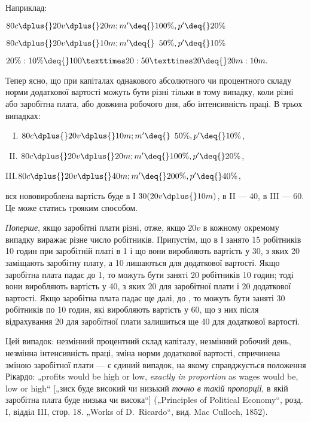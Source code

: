 
Наприклад:
\begin{center}
$80 c \dplus{} 20 v \dplus{} 20 m; m' \deq{} 100\%, p' \deq{} 20\%$

$80 c \dplus{} 20 v \dplus{} 10 m; m' \deq{} \phantom{0}50\%, p' \deq{} 10\%$

$20\%:10\% \deq{} 100×20:50×20 \deq{} 20 m:10 m.$
\end{center}

Тепер ясно, що при капіталах однакового абсолютного чи
процентного складу норми додаткової вартості можуть бути
різні тільки в тому випадку, коли різні або заробітна плата,
або довжина робочого дня, або інтенсивність праці. В трьох
випадках:
\begin{center}
$\phantom{II}$I. $80 c \dplus{} 20 v \dplus{} 10 m; m' \deq{} \phantom{0}50\%, p' \deq{} 10\%$,

$\phantom{I}$II. $80 c \dplus{} 20 v \dplus{} 20 m; m' \deq{} 100\%, p' \deq{} 20\%$,

III.$80 c \dplus{} 20 v \dplus{} 40 m; m' \deq{} 200\%, p' \deq{} 40\%$,
\end{center}
вся нововироблена вартість буде в І $30 (20 v \dplus{} 10 m)$, в II — 40,
в III — 60. Це може статись трояким способом.

\emph{Поперше}, якщо заробітні плати різні, отже, якщо $20 v$ в кожному
окремому випадку виражає різне число робітників. Припустім,
що в І занято 15 робітників 10 годин при заробітній
платі в 1 і що вони виробляють вартість
у 30, з яких 20 заміщають
заробітну плату, а 10 лишаються для додаткової
вартості. Якщо заробітна плата падає до 1,
то можуть бути заняті 20 робітників 10 годин; тоді вони
виробляють вартість у 40, з яких 20 для заробітної плати і 20 додаткової
вартості. Якщо заробітна плата падає ще далі, до , то можуть бути заняті 30 робітників по 10 годин,
які виробляють вартість у 60, що з них після
відрахування 20 для заробітної плати залишиться
ще 40 для додаткової вартості.

Цей випадок: незмінний процентний склад капіталу, незмінний
робочий день, незмінна інтенсивність праці, зміна норми
додаткової вартості, спричинена зміною заробітної плати — є
єдиний випадок, на якому справджується положення Рікардо:
„profits would be high or low, \emph{exactly in proportion} as wages
would be, low or high“ [„зиск буде високий чи низький \emph{точно
в такій пропорції}, в якій заробітна плата буде низька чи висока“]
(„Principles of Political Economy“, розд. І, відділ III, стор. 18.
„Works of D.~Ricardo“, вид. Mac Culloch, 1852).

